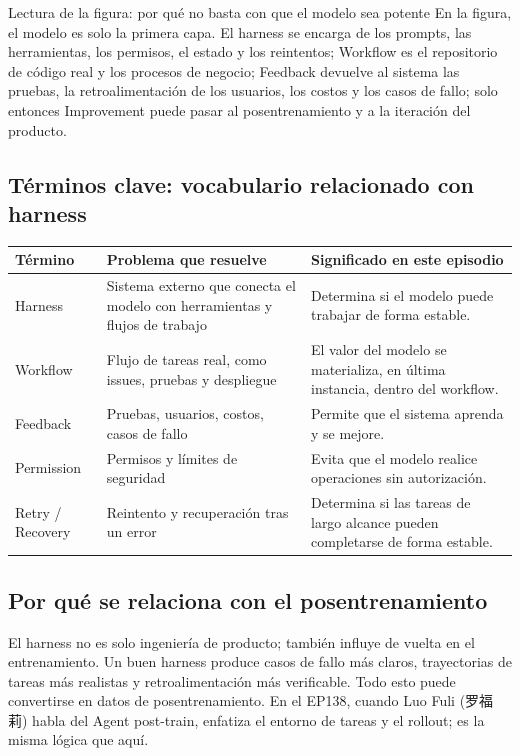 \documentclass[a4paper]{article}
\begin{document}
\begin{knowledgebox}{Lectura de la figura: por qué no basta con que el modelo sea potente}
En la figura, el modelo es solo la primera capa. El harness se encarga de los prompts, las herramientas, los permisos, el estado y los reintentos; Workflow es el repositorio de código real y los procesos de negocio; Feedback devuelve al sistema las pruebas, la retroalimentación de los usuarios, los costos y los casos de fallo; solo entonces Improvement puede pasar al posentrenamiento y a la iteración del producto.
\end{knowledgebox}

\subsection{Términos clave: vocabulario relacionado con harness}

\noindent\begin{tabularx}{\textwidth}{p{}p{}X}
\toprule
Término & Problema que resuelve & Significado en este episodio \\
\midrule
Harness & Sistema externo que conecta el modelo con herramientas y flujos de trabajo & Determina si el modelo puede trabajar de forma estable. \\
Workflow & Flujo de tareas real, como issues, pruebas y despliegue & El valor del modelo se materializa, en última instancia, dentro del workflow. \\
Feedback & Pruebas, usuarios, costos, casos de fallo & Permite que el sistema aprenda y se mejore. \\
Permission & Permisos y límites de seguridad & Evita que el modelo realice operaciones sin autorización. \\
Retry / Recovery & Reintento y recuperación tras un error & Determina si las tareas de largo alcance pueden completarse de forma estable. \\
\bottomrule
\end{tabularx}

\subsection{Por qué se relaciona con el posentrenamiento}

El harness no es solo ingeniería de producto; también influye de vuelta en el entrenamiento. Un buen harness produce casos de fallo más claros, trayectorias de tareas más realistas y retroalimentación más verificable. Todo esto puede convertirse en datos de posentrenamiento. En el EP138, cuando Luo Fuli (罗福莉) habla del Agent post-train, enfatiza el entorno de tareas y el rollout; es la misma lógica que aquí.
\end{document}
